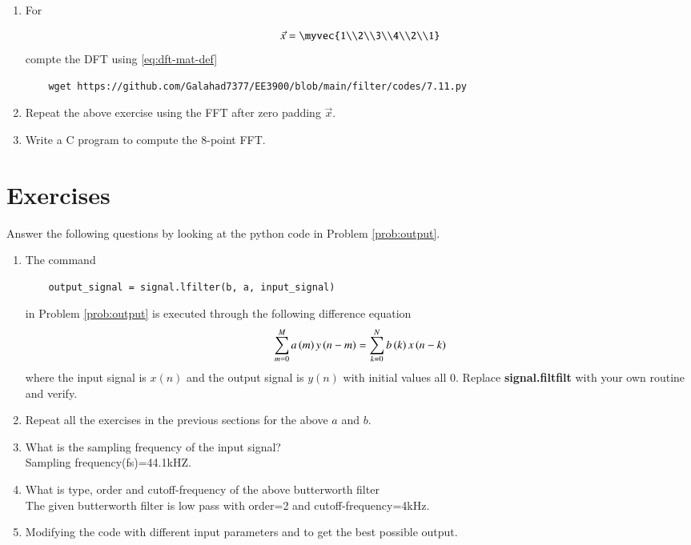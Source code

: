 \documentclass[journal,12pt,twocolumn]{IEEEtran}
\renewcommand\thesection{\arabic{section}}
\begin{document}
\begin{enumerate}[label=\thesection.\arabic*]
\item For 

    \begin{align}
	    \vec{x} = \myvec{1\\2\\3\\4\\2\\1}
        \label{eq:equation1}
    \end{align}
    compte the DFT  
		using 
	    \eqref{eq:dft-mat-def}
     
\solution
\begin{lstlisting}
    wget https://github.com/Galahad7377/EE3900/blob/main/filter/codes/7.11.py
\end{lstlisting}
    \item Repeat the above exercise using the FFT
	    after zero padding $\vec{x}$.
\item Write a C program to compute the 8-point FFT. 
 \end{enumerate}
\section{Exercises}
Answer the following questions by looking at the python code in Problem \ref{prob:output}.
\begin{enumerate}[label=\thesection.\arabic*]
\item
The command
\begin{lstlisting}
	output_signal = signal.lfilter(b, a, input_signal)
	\end{lstlisting}
in Problem \ref{prob:output} is executed through the following difference equation
\begin{equation}
\label{eq:iir_filter_gen}
 \sum _{m=0}^{M}a\left(m\right)y\left(n-m\right)=\sum _{k=0}^{N}b\left(k\right)x\left(n-k\right)
\end{equation}
%
where the input signal is $x(n)$ and the output signal is $y(n)$ with initial values all 0. Replace
\textbf{signal.filtfilt} with your own routine and verify.
%
\item Repeat all the exercises in the previous sections for the above $a$ and $b$.

\item What is the sampling frequency of the input signal?
\\
\solution
Sampling frequency(fs)=44.1kHZ.
\item
What is type, order and  cutoff-frequency of the above butterworth filter
\\
\solution
The given butterworth filter is low pass with order=2 and cutoff-frequency=4kHz.
%
\item
Modifying the code with different input parameters and to get the best possible output.
%
\end{enumerate}
\end{document}
